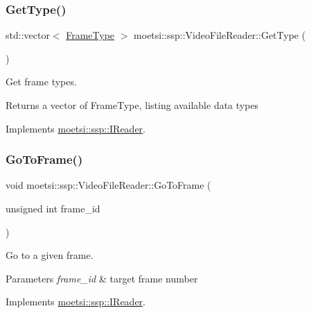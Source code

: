 \subsubsection{\texorpdfstring{Get\+Type()}{GetType()}}
{\footnotesize\ttfamily std\+::vector$<$ \hyperlink{namespacemoetsi_1_1ssp_a46efdfa2cd5a28ead465dcc8006b5a87}{Frame\+Type} $>$ moetsi\+::ssp\+::\+Video\+File\+Reader\+::\+Get\+Type (\begin{DoxyParamCaption}{ }\end{DoxyParamCaption})\hspace{0.3cm}{\ttfamily [virtual]}}



Get frame types. 

\begin{DoxyReturn}{Returns}
a vector of Frame\+Type, listing available data types 
\end{DoxyReturn}


Implements \hyperlink{classmoetsi_1_1ssp_1_1IReader_a4116c1931fde7bd66133934ffdca1cce}{moetsi\+::ssp\+::\+I\+Reader}.

\mbox{\label{classmoetsi_1_1ssp_1_1VideoFileReader_ad98a532db8b1e2c3879df274b2efb082}} 
\subsubsection{\texorpdfstring{Go\+To\+Frame()}{GoToFrame()}}
{\footnotesize\ttfamily void moetsi\+::ssp\+::\+Video\+File\+Reader\+::\+Go\+To\+Frame (\begin{DoxyParamCaption}\item[{unsigned int}]{frame\+\_\+id }\end{DoxyParamCaption})\hspace{0.3cm}{\ttfamily [virtual]}}



Go to a given frame. 


\begin{DoxyParams}{Parameters}
{\em frame\+\_\+id} & target frame number \\
\hline
\end{DoxyParams}


Implements \hyperlink{classmoetsi_1_1ssp_1_1IReader_a6f1be3c06538992cca6d550bd9566681}{moetsi\+::ssp\+::\+I\+Reader}.

